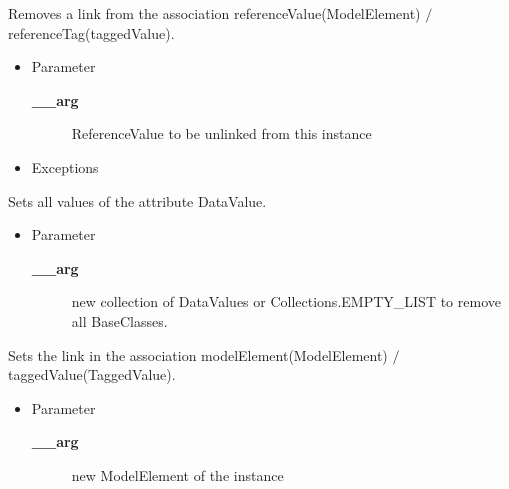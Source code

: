 \begin{desc}Removes a link from the association referenceValue(ModelElement)
 $/$ referenceTag(taggedValue).
\begin{itemize}
\item{Parameter
  \begin{description}
   \item[{\bf \_\_arg}]{ReferenceValue to be unlinked from this instance}
  \end{description}}
\end{itemize}
\begin{itemize}
\item{{Exceptions}
}
\end{itemize}
\end{desc}

\begin{desc}Sets all values of the attribute DataValue.
\begin{itemize}
\item{Parameter
  \begin{description}
   \item[{\bf \_\_arg}]{new collection of DataValues or Collections.EMPTY\_LIST to
        remove all BaseClasses.}
  \end{description}}
\end{itemize}
\end{desc}

\begin{desc}Sets the link in the association modelElement(ModelElement)
 $/$ taggedValue(TaggedValue).
\begin{itemize}
\item{Parameter
  \begin{description}
   \item[{\bf \_\_arg}]{new ModelElement of the instance}
  \end{description}}
\end{itemize}
\end{desc}

